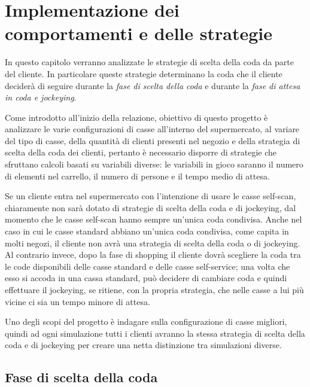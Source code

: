\chapter{Implementazione dei comportamenti e delle strategie}
\label{implementation:intro}

In questo capitolo verranno analizzate le strategie di scelta della coda da parte del cliente. In particolare queste strategie determinano la coda che il cliente deciderà di seguire durante la \textit{fase di scelta della coda} e durante la \textit{fase di attesa in coda e jockeying}. 

\vspace*{1\baselineskip}

Come introdotto all'inizio della relazione, obiettivo di questo progetto è analizzare le varie configurazioni di casse all'interno del supermercato, al variare del tipo di casse, della quantità di clienti presenti nel negozio e della strategia di scelta della coda dei clienti, pertanto è necessario disporre di strategie che sfruttano calcoli basati su variabili diverse: le variabili in gioco saranno il numero di elementi nel carrello, il numero di persone e il tempo medio di attesa.

Se un cliente entra nel supermercato con l'intenzione di usare le casse self-scan, chiaramente non sarà dotato di strategie di scelta della coda e di jockeying, dal momento che le casse self-scan hanno sempre un'unica coda condivisa. Anche nel caso in cui le casse standard abbiano un'unica coda condivisa, come capita in molti negozi, il cliente non avrà una strategia di scelta della coda o di jockeying. Al contrario invece, dopo la fase di shopping il cliente dovrà scegliere la coda tra le code disponibili delle casse standard e delle casse self-service; una volta che esso si accoda in una cassa standard, può decidere di cambiare coda e quindi effettuare il jockeying, se ritiene, con la propria strategia, che nelle casse a lui più vicine ci sia un tempo minore di attesa.

Uno degli scopi del progetto è indagare sulla configurazione di casse migliori, quindi ad ogni simulazione tutti i clienti avranno la stessa strategia di scelta della coda e di jockeying per creare una netta distinzione tra simulazioni diverse.

\section{Fase di scelta della coda}
\label{implementation:queuechoice}

